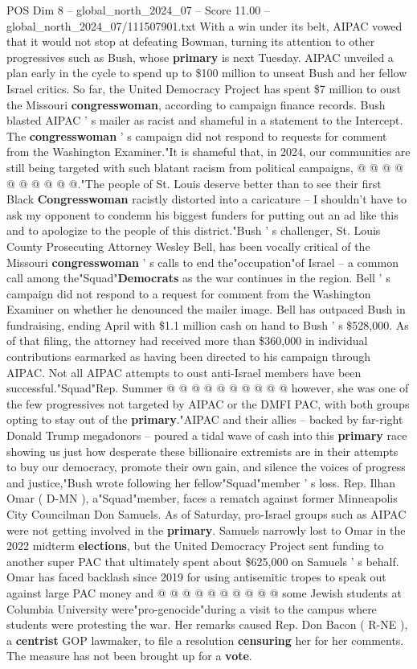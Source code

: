 \begin{textsample}{POS Dim 8 – global\_north\_2024\_07 – Score 11.00 – global\_north\_2024\_07/111507901.txt}
With a win under its belt, AIPAC vowed that it would not stop at defeating Bowman, turning its attention to other progressives such as Bush, whose \textbf{primary} is next Tuesday.
AIPAC unveiled a plan early in the cycle to spend up to \$100 million to unseat Bush and her fellow Israel critics.
So far, the United Democracy Project has spent \$7 million to oust the Missouri \textbf{congresswoman}, according to campaign finance records.
Bush blasted AIPAC ' s mailer as racist and shameful in a statement to the Intercept.
The \textbf{congresswoman} ' s campaign did not respond to requests for comment from the Washington Examiner."It is shameful that, in 2024, our communities are still being targeted with such blatant racism from political campaigns, @ @ @ @ @ @ @ @ @ @."The people of St.
Louis deserve better than to see their first Black \textbf{Congresswoman} racistly distorted into a caricature -- I shouldn't have to ask my opponent to condemn his biggest funders for putting out an ad like this and to apologize to the people of this district."Bush ' s challenger, St.
Louis County Prosecuting Attorney Wesley Bell, has been vocally critical of the Missouri \textbf{congresswoman} ' s calls to end the"occupation"of Israel -- a common call among the"Squad"\textbf{Democrats} as the war continues in the region.
Bell ' s campaign did not respond to a request for comment from the Washington Examiner on whether he denounced the mailer image.
Bell has outpaced Bush in fundraising, ending April with \$1.1 million cash on hand to Bush ' s \$528,000.
As of that filing, the attorney had received more than \$360,000 in individual contributions earmarked as having been directed to his campaign through AIPAC.
Not all AIPAC attempts to oust anti-Israel members have been successful."Squad"Rep.
Summer @ @ @ @ @ @ @ @ @ @ however, she was one of the few progressives not targeted by AIPAC or the DMFI PAC, with both groups opting to stay out of the \textbf{primary}."AIPAC and their allies -- backed by far-right Donald Trump megadonors -- poured a tidal wave of cash into this \textbf{primary} race showing us just how desperate these billionaire extremists are in their attempts to buy our democracy, promote their own gain, and silence the voices of progress and justice,"Bush wrote following her fellow"Squad"member ' s loss.
Rep.
Ilhan Omar ( D-MN ), a"Squad"member, faces a rematch against former Minneapolis City Councilman Don Samuels.
As of Saturday, pro-Israel groups such as AIPAC were not getting involved in the \textbf{primary}.
Samuels narrowly lost to Omar in the 2022 midterm \textbf{elections}, but the United Democracy Project sent funding to another super PAC that ultimately spent about \$625,000 on Samuels ' s behalf.
Omar has faced backlash since 2019 for using antisemitic tropes to speak out against large PAC money and @ @ @ @ @ @ @ @ @ @ some Jewish students at Columbia University were"pro-genocide"during a visit to the campus where students were protesting the war.
Her remarks caused Rep.
Don Bacon ( R-NE ), a \textbf{centrist} GOP lawmaker, to file a resolution \textbf{censuring} her for her comments.
The measure has not been brought up for a \textbf{vote}.


\end{textsample}
